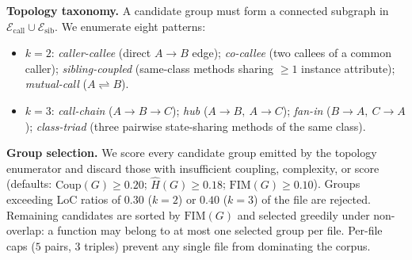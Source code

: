 \textbf{Topology taxonomy.}
A candidate group must form a connected subgraph in
$\mathcal{E}_{\mathrm{call}} \cup \mathcal{E}_{\mathrm{sib}}$. We
enumerate eight patterns:
\begin{itemize}\setlength\itemsep{0.1em}
  \item \emph{$k=2$}: \emph{caller-callee} (direct $A\!\to\!B$ edge);
  \emph{co-callee} (two callees of a common caller); \emph{sibling-coupled}
  (same-class methods sharing $\geq 1$ instance attribute);
  \emph{mutual-call} ($A\!\rightleftharpoons\!B$).
  \item \emph{$k=3$}: \emph{call-chain} ($A\!\to\!B\!\to\!C$); \emph{hub}
  ($A\!\to\!B,\ A\!\to\!C$); \emph{fan-in} ($B\!\to\!A,\ C\!\to\!A$);
  \emph{class-triad} (three pairwise state-sharing methods of the same
  class).
\end{itemize}

\textbf{Group selection.}
We score every candidate group emitted by the topology enumerator and
discard those with insufficient coupling, complexity, or score
(defaults: $\mathrm{Coup}(G) \ge 0.20$; $\hat{H}(G) \ge 0.18$;
$\mathrm{FIM}(G) \ge 0.10$). Groups exceeding LoC ratios of $0.30$
($k=2$) or $0.40$ ($k=3$) of the file are rejected. Remaining
candidates are sorted by $\mathrm{FIM}(G)$ and selected greedily under
non-overlap: a function may belong to at most one selected group per
file. Per-file caps ($5$ pairs, $3$ triples) prevent any single file
from dominating the corpus.

